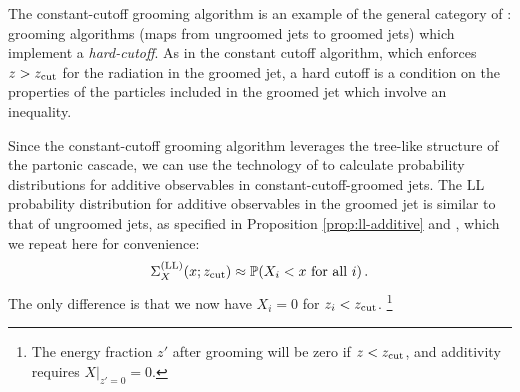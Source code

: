 



    The \gls{constant-cutoff} grooming algorithm is an example of the general category of :
    grooming algorithms (maps from ungroomed jets to groomed jets) which implement a \textit{hard-cutoff}.
    As in the constant cutoff algorithm, which enforces \(z > z_{\rm cut}\) for the radiation in the groomed jet, a hard cutoff is a condition on the properties of the particles included in the groomed jet which involve an inequality.




Since the \gls{constant-cutoff} grooming algorithm leverages the tree-like structure of the partonic cascade, we can use the technology of  to calculate probability distributions for additive observables in constant-cutoff-groomed jets.
%
The LL probability distribution for additive observables in the groomed jet is similar to that of ungroomed jets, as specified in Proposition \ref{prop:ll-additive} and , which we repeat here for convenience:
\begin{align}
    \label{eq:ll-groomed-additive}
    \Sigma^{\text{(LL)}}_X(x; \zcut) \approx \mathbb{P}(X_i < x \text{ for all } i)
    \,.
\end{align}
%
The only difference is that we now have \(X_i = 0\) for \(z_i < z_{\rm cut}\).%
\footnote{
    The energy fraction \(z'\) after grooming will be zero if \(z < z_{\rm cut}\), and additivity requires \(X \big|_{z' = 0} = 0\).
}


